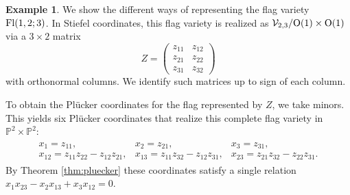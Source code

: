 \documentclass[12pt]{extarticle}
\theoremstyle{definition}
\newtheorem{example}[theorem]{Example}
\numberwithin{theorem}{section}
\begin{document}
\begin{example} 
    We show the different ways of representing the flag variety ${\rm Fl}(1, 2; 3)$. 
    In Stiefel coordinates, this flag variety is realized as $\mathcal V_{2,3} / {\rm O}(1) \times {\rm O}(1)$ via a $3 \times 2$ matrix 
    $$Z = \begin{pmatrix} z_{11} & z_{12} \\ z_{21} & z_{22} \\ z_{31} & z_{32} \end{pmatrix}$$ with orthonormal columns. We identify such matrices up to  sign of each column.

    To obtain the Pl\"{u}cker coordinates for the flag represented by $Z$, we take minors. 
    This yields six Pl\"ucker coordinates that realize this complete flag variety in $\mathbb{P}^2 \times \mathbb{P}^2$:
    \begin{align*}
    \begin{matrix}
        x_1 = z_{11}, & x_2 = z_{21}, & x_3 = z_{31},\\
        x_{12} = z_{11}z_{22} - z_{12}z_{21},
        & 
        x_{13} = z_{11}z_{32} - z_{12}z_{31},
        &
        x_{23} = z_{21}z_{32} - z_{22}z_{31}.
        \end{matrix}
    \end{align*}
    By Theorem \ref{thm:pluecker} these coordinates satisfy a single relation $x_1 x_{23} - x_2 x_{13} + x_3 x_{12} = 0$.


\end{example}
\end{document}
